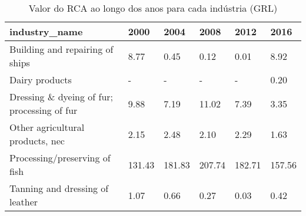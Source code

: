 \begin{table}
\centering
\caption{Valor do RCA ao longo dos anos para cada indústria (GRL)}
\begin{tabular}{p{6cm}p{1.5cm}p{1.5cm}p{1.5cm}p{1.5cm}p{1.5cm}}
\toprule
                              industry\_name &   2000 &   2004 &   2008 &   2012 &   2016 \\
\midrule
            Building and repairing of ships &   8.77 &   0.45 &   0.12 &   0.01 &   8.92 \\
                             Dairy products &      - &      - &      - &      - &   0.20 \\
Dressing \& dyeing of fur; processing of fur &   9.88 &   7.19 &  11.02 &   7.39 &   3.35 \\
           Other agricultural products, nec &   2.15 &   2.48 &   2.10 &   2.29 &   1.63 \\
              Processing/preserving of fish & 131.43 & 181.83 & 207.74 & 182.71 & 157.56 \\
            Tanning and dressing of leather &   1.07 &   0.66 &   0.27 &   0.03 &   0.42 \\
\bottomrule
\end{tabular}
\end{table}
